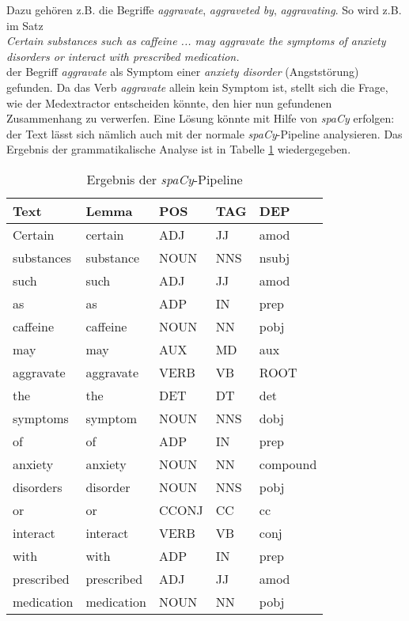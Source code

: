 Dazu gehören z.B. die Begriffe \emph{aggravate}, \emph{aggraveted by}, \emph{aggravating}. So wird z.B. im Satz\\

\emph{\glqq Certain substances such as caffeine ... may aggravate the symptoms of anxiety disorders or interact with prescribed medication.\grqq}\\

der Begriff \emph{aggravate} als Symptom einer \emph{anxiety disorder} (Angststörung) gefunden. Da das Verb \emph{aggravate} allein kein Symptom ist, stellt sich die Frage, wie der Medextractor entscheiden könnte, den hier nun gefundenen Zusammenhang zu verwerfen. Eine Lösung könnte mit Hilfe von \emph{spaCy} erfolgen: der Text lässt sich nämlich auch mit der normale \emph{spaCy}-Pipeline analysieren. Das Ergebnis der grammatikalische Analyse ist in Tabelle \ref{tab:spaCy} wiedergegeben.

\begin{table}
\begin{center}
\begin{tabular}{lllll}
\hline
\textbf{Text}	& \textbf{Lemma}	& \textbf{POS} & \textbf{TAG} & \textbf{DEP} \\
\hline
Certain & certain & ADJ & JJ & amod \\
substances & substance & NOUN & NNS & nsubj \\
such & such & ADJ & JJ & amod \\
as & as & ADP & IN & prep \\
caffeine & caffeine & NOUN & NN & pobj \\
may & may & AUX & MD & aux \\
aggravate & aggravate & VERB & VB & ROOT \\
the & the & DET & DT & det \\
symptoms & symptom & NOUN & NNS & dobj \\
of & of & ADP & IN & prep \\
anxiety & anxiety & NOUN & NN & compound \\
disorders & disorder & NOUN & NNS & pobj \\
or & or & CCONJ & CC & cc \\
interact & interact & VERB & VB & conj \\
with & with & ADP & IN & prep \\
prescribed & prescribed & ADJ & JJ & amod \\
medication & medication & NOUN & NN & pobj \\
\hline
\end{tabular}
\caption{Ergebnis der \emph{spaCy}-Pipeline}
\label{tab:spaCy}
\end{center}
\end{table}

